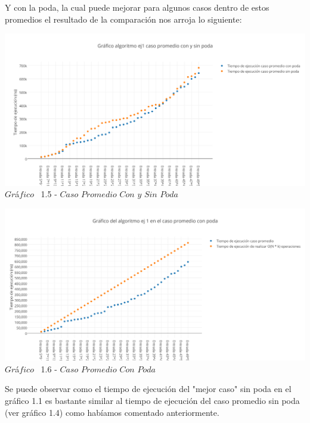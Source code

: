 Y con la poda, la cual puede mejorar para algunos casos dentro de estos promedios el resultado de la comparaci\'on nos arroja lo siguiente:

\vspace*{0.3cm} \vspace*{0.3cm}
  \begin{center}
 \includegraphics[scale=0.65]{./EJ1/promedio1.png}
 {$Gr$\'a$fico$ \ 1.5 - $Caso$ $Promedio$ $Con$ $y$ $Sin$ $Poda$}
  \end{center}
  \vspace*{0.3cm}
  

\vspace*{0.3cm} \vspace*{0.3cm}
  \begin{center}
 \includegraphics[scale=0.65]{./EJ1/promedio11.png}
 {$Gr$\'a$fico$ \ 1.6 - $Caso$ $Promedio$ $Con$ $Poda$}
  \end{center}
  \vspace*{0.3cm}  
  
  
Se puede observar como el tiempo de ejecuci\'on del "mejor caso" sin poda en el gr\'afico 1.1 es bastante similar al tiempo de ejecuci\'on del caso promedio sin poda (ver gr\'afico 1.4) como hab\'iamos comentado anteriormente.\\

